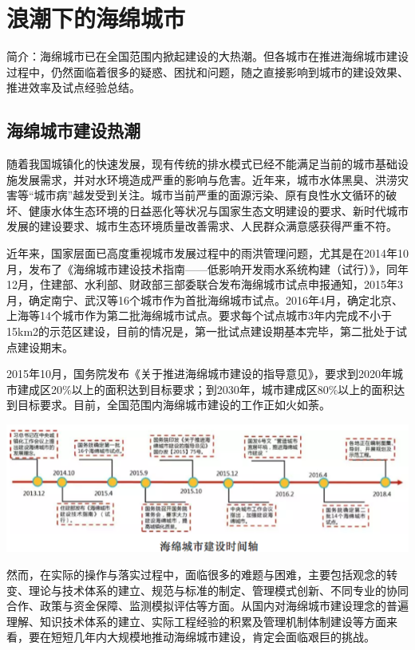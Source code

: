 \documentclass[
]{book}
\begin{document}
\hypertarget{ux6d6aux6f6eux4e0bux7684ux6d77ux7ef5ux57ceux5e02}{%
\section{浪潮下的海绵城市}\label{ux6d6aux6f6eux4e0bux7684ux6d77ux7ef5ux57ceux5e02}}

简介：海绵城市已在全国范围内掀起建设的大热潮。但各城市在推进海绵城市建设过程中，仍然面临着很多的疑惑、困扰和问题，随之直接影响到城市的建设效果、推进效率及试点经验总结。

\hypertarget{ux6d77ux7ef5ux57ceux5e02ux5efaux8bbeux70edux6f6e}{%
\subsection{海绵城市建设热潮}\label{ux6d77ux7ef5ux57ceux5e02ux5efaux8bbeux70edux6f6e}}

随着我国城镇化的快速发展，现有传统的排水模式已经不能满足当前的城市基础设施发展需求，并对水环境造成严重的影响与危害。近年来，城市水体黑臭、洪涝灾害等``城市病''越发受到关注。城市当前严重的面源污染、原有良性水文循环的破坏、健康水体生态环境的日益恶化等状况与国家生态文明建设的要求、新时代城市发展的建设要求、城市生态环境质量改善需求、人民群众满意感获得严重不符。

近年来，国家层面已高度重视城市发展过程中的雨洪管理问题，尤其是在2014年10月，发布了《海绵城市建设技术指南------低影响开发雨水系统构建（试行）》，同年12月，住建部、水利部、财政部三部委联合发布海绵城市试点申报通知，2015年3月，确定南宁、武汉等16个城市作为首批海绵城市试点。2016年4月，确定北京、上海等14个城市作为第二批海绵城市试点。要求每个试点城市3年内完成不小于15km2的示范区建设，目前的情况是，第一批试点建设期基本完毕，第二批处于试点建设期末。

2015年10月，国务院发布《关于推进海绵城市建设的指导意见》，要求到2020年城市建成区20\%以上的面积达到目标要求；到2030年，城市建成区80\%以上的面积达到目标要求。目前，全国范围内海绵城市建设的工作正如火如荼。

\includegraphics[width=8.33in]{images/hm1}

然而，在实际的操作与落实过程中，面临很多的难题与困难，主要包括观念的转变、理论与技术体系的建立、规范与标准的制定、管理模式创新、不同专业的协同合作、政策与资金保障、监测模拟评估等方面。从国内对海绵城市建设理念的普遍理解、知识技术体系的建立、实际工程经验的积累及管理机制体制建设等方面来看，要在短短几年内大规模地推动海绵城市建设，肯定会面临艰巨的挑战。
\end{document}
